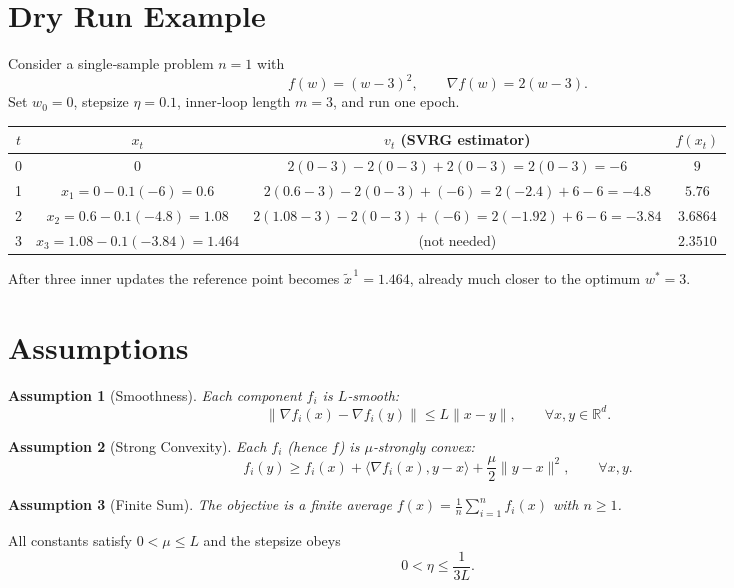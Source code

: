 \documentclass{article}
\newtheorem{assumption}{Assumption}
\newcommand{\R}{\mathbb{R}}
\begin{document}
\section*{Dry Run Example}
Consider a single‑sample problem $n=1$ with 
\[
f(w)=(w-3)^{2},\qquad \nabla f(w)=2(w-3).
\]
Set $w_{0}=0$, stepsize $\eta=0.1$, inner‑loop length $m=3$, and run one epoch.

\begin{center}
\begin{tabular}{c|c|c|c}
$t$ & $x_{t}$ & $v_{t}$ (SVRG estimator) & $f(x_{t})$\\ \hline
0 & $0$ & $2(0-3)-2(0-3)+2(0-3)=2(0-3)=-6$ & $9$\\
1 & $x_{1}=0-0.1(-6)=0.6$ & $2(0.6-3)-2(0-3)+(-6)=2(-2.4)+6-6=-4.8$ & $5.76$\\
2 & $x_{2}=0.6-0.1(-4.8)=1.08$ & $2(1.08-3)-2(0-3)+(-6)=2(-1.92)+6-6=-3.84$ & $3.6864$\\
3 & $x_{3}=1.08-0.1(-3.84)=1.464$ & (not needed) & $2.3510$\\
\end{tabular}
\end{center}
After three inner updates the reference point becomes $\tilde{x}^{\,1}=1.464$, already much closer to the optimum $w^{*}=3$.

\newpage
\section*{Assumptions}
\begin{assumption}[Smoothness]\label{as:smooth}
Each component $f_i$ is $L$‑smooth:
\[
\|\nabla f_i(x)-\nabla f_i(y)\|\le L\|x-y\|,\qquad\forall x,y\in\R^{d}.
\]
\end{assumption}
\begin{assumption}[Strong Convexity]\label{as:strong}
Each $f_i$ (hence $f$) is $\mu$‑strongly convex:
\[
f_i(y)\ge f_i(x)+\langle\nabla f_i(x),y-x\rangle+\frac{\mu}{2}\|y-x\|^{2},
\qquad\forall x,y.
\]
\end{assumption}
\begin{assumption}[Finite Sum]\label{as:finite}
The objective is a finite average $f(x)=\frac1n\sum_{i=1}^{n}f_i(x)$ with $n\ge 1$.
\end{assumption}
All constants satisfy $0<\mu\le L$ and the stepsize obeys
\[
0<\eta\le\frac{1}{3L}. \tag{A1}
\]
\end{document}
